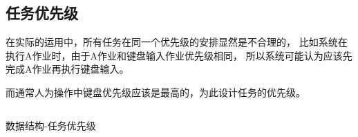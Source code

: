       \subsection{任务优先级}

      在实际的运用中，所有任务在同一个优先级的安排显然是不合理的，
      比如系统在执行A作业时，由于A作业和键盘输入作业优先级相同，
      所以系统可能认为应该先完成A作业再执行键盘输入。

      而通常人为操作中键盘优先级应该是最高的，为此设计任务的优先级。

      \begin{listing}[H]
        \inputminted[tabsize=2, firstline=222, lastline=226,
        linenos=true]{c}{../ZOS/src/kernel/bootpack.h}
        \caption{数据结构-任务优先级}
        \label{lst:task_level}
      \end{listing}


